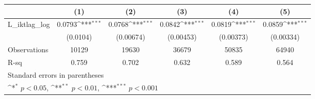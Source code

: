 {
\def\sym#1{\ifmmode^{#1}\else\(^{#1}\)\fi}
\begin{tabular}{l*{5}{c}}
\hline\hline
                &\multicolumn{1}{c}{(1)}         &\multicolumn{1}{c}{(2)}         &\multicolumn{1}{c}{(3)}         &\multicolumn{1}{c}{(4)}         &\multicolumn{1}{c}{(5)}         \\
\hline
L\_iktlag\_log    &   0.0793\sym{***}&   0.0768\sym{***}&   0.0842\sym{***}&   0.0819\sym{***}&   0.0859\sym{***}\\
                & (0.0104)         &(0.00674)         &(0.00453)         &(0.00373)         &(0.00334)         \\
\hline
Observations    &    10129         &    19630         &    36679         &    50835         &    64940         \\
R-sq            &    0.759         &    0.702         &    0.632         &    0.589         &    0.564         \\
\hline\hline
\multicolumn{6}{l}{\footnotesize Standard errors in parentheses}\\
\multicolumn{6}{l}{\footnotesize \sym{*} \(p<0.05\), \sym{**} \(p<0.01\), \sym{***} \(p<0.001\)}\\
\end{tabular}
}
